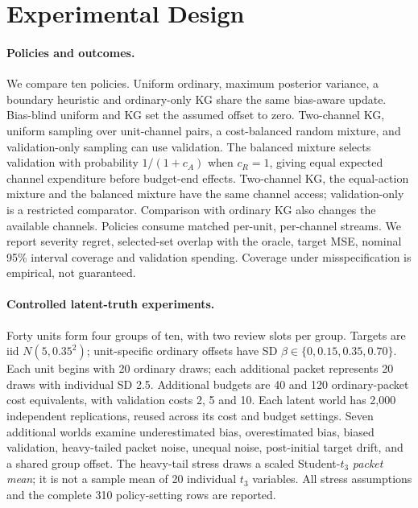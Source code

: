 \section{Experimental Design}
\label{sec:experiments}
\paragraph{Policies and outcomes.}
We compare ten policies. Uniform ordinary, maximum posterior variance, a boundary heuristic and ordinary-only KG share the same bias-aware update. Bias-blind uniform and KG set the assumed offset to zero. Two-channel KG, uniform sampling over unit-channel pairs, a cost-balanced random mixture, and validation-only sampling can use validation. The balanced mixture selects validation with probability $1/(1+c_A)$ when $c_R=1$, giving equal expected channel expenditure before budget-end effects. Two-channel KG, the equal-action mixture and the balanced mixture have the same channel access; validation-only is a restricted comparator. Comparison with ordinary KG also changes the available channels. Policies consume matched per-unit, per-channel streams. We report severity regret, selected-set overlap with the oracle, target MSE, nominal 95\% interval coverage and validation spending. Coverage under misspecification is empirical, not guaranteed.

\paragraph{Controlled latent-truth experiments.}
Forty units form four groups of ten, with two review slots per group. Targets are iid $N(5,0.35^2)$; unit-specific ordinary offsets have SD $\beta\in\{0,0.15,0.35,0.70\}$. Each unit begins with 20 ordinary draws; each additional packet represents 20 draws with individual SD 2.5. Additional budgets are 40 and 120 ordinary-packet cost equivalents, with validation costs 2, 5 and 10. Each latent world has 2,000 independent replications, reused across its cost and budget settings. Seven additional worlds examine underestimated bias, overestimated bias, biased validation, heavy-tailed packet noise, unequal noise, post-initial target drift, and a shared group offset. The heavy-tail stress draws a scaled Student-$t_3$ \emph{packet mean}; it is not a sample mean of 20 individual $t_3$ variables. All stress assumptions and the complete 310 policy-setting rows are reported.

